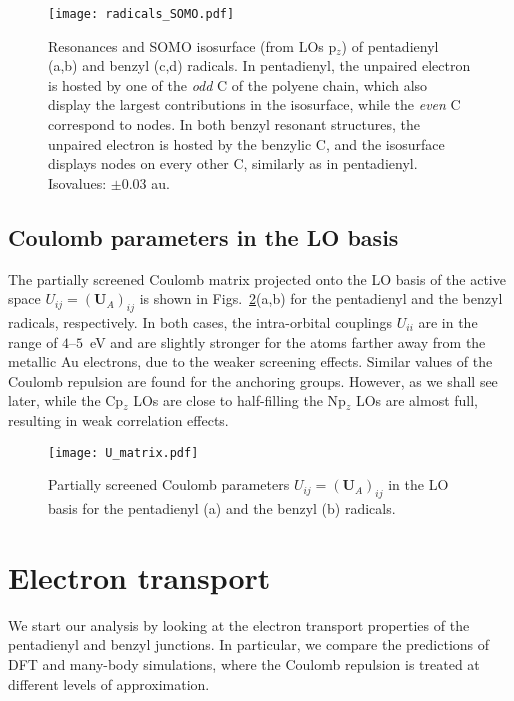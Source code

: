 \documentclass[aps,prx,twocolumn,superscriptaddress]{revtex4-2}
\begin{document}
\begin{figure}[t]
\texttt{[image: radicals\_SOMO.pdf]}
\caption{Resonances and SOMO isosurface (from LOs p$_z$) of pentadienyl (a,b) and benzyl (c,d) radicals. 
In pentadienyl, the unpaired electron is hosted by one of the \emph{odd} C of the polyene chain, 
which also display the largest contributions in the isosurface, while the \emph{even} C correspond to nodes.  
In both benzyl resonant structures, the unpaired electron is hosted by the benzylic C, 
and the isosurface displays nodes on every other C, similarly as in pentadienyl. 
Isovalues: $\pm 0.03$ au. }
\label{fig:radicals_SOMO}  
\end{figure}

\subsection{Coulomb parameters in the LO basis} \label{sec:UijLOs} 
The partially screened Coulomb matrix projected onto the LO basis of the active space $U_{ij} = (\mathbf{U}_A)_{ij}$ 
is shown in Figs.~\ref{fig:U_matrix}(a,b) for the pentadienyl and the benzyl radicals, respectively. 
In both cases, the intra-orbital couplings $U_{ii}$ are in the range of $4$--$5$~eV 
and are slightly stronger for the atoms farther away from the metallic Au electrons, due to the weaker screening effects. 
Similar values of the Coulomb repulsion are found for the anchoring groups.
However, as we shall see later, while the Cp$_z$ LOs are close to half-filling 
the Np$_z$ LOs are almost full, resulting in weak correlation effects. 

\begin{figure}[t]
\texttt{[image: U\_matrix.pdf]}
\caption{Partially screened Coulomb parameters $U_{ij} = (\mathbf{U}_A)_{ij}$ in the LO basis 
for the pentadienyl (a) and the benzyl (b) radicals. }
\label{fig:U_matrix}  
\end{figure}



\section{Electron transport}\label{sec:transport}
We start our analysis by looking at the electron transport properties of the pentadienyl and benzyl junctions. 
In particular, we compare the predictions of DFT and many-body simulations, 
where the Coulomb repulsion is treated at different levels of approximation. 
\end{document}
